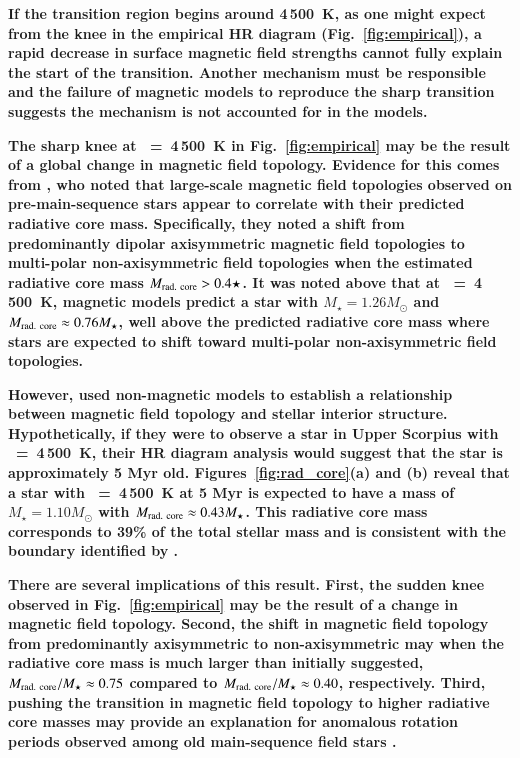 \documentclass{aa}
\begin{document}

{\bf If the transition region begins around 4\,500~K, as one might expect from the knee in the empirical HR diagram (Fig.~\ref{fig:empirical}), a rapid decrease in surface magnetic field strengths cannot fully explain the start of the transition. Another mechanism must be responsible and the failure of magnetic models to reproduce the sharp transition suggests the mechanism is not accounted for in the models.}

{\bf The sharp knee at \teff~=~4\,500~K in Fig.~\ref{fig:empirical} may be the result of a global change in magnetic field topology. Evidence for this comes from \citet{Gregory2012}, who noted that large-scale magnetic field topologies observed on pre-main-sequence stars appear to correlate with their predicted radiative core mass. Specifically, they noted a shift from predominantly dipolar axisymmetric magnetic field topologies to multi-polar non-axisymmetric field topologies when the estimated radiative core mass $M_{\rm rad.\ core} > 0.4 \star$. It was noted above that at \teff~=~4\,500~K, magnetic models predict a star with $M_{\star} = 1.26 M_{\odot}$ and $M_{\rm rad.\ core} \approx 0.76 M_{\star}$, well above the predicted radiative core mass where stars are expected to shift toward multi-polar non-axisymmetric field topologies.}

{\bf However, \citet{Gregory2012} used non-magnetic models \citep{Siess2000} to establish a relationship between magnetic field topology and stellar interior structure. Hypothetically, if they were to observe a star in Upper Scorpius with \teff~=~4\,500~K, their HR diagram analysis would suggest that the star is approximately 5 Myr old. Figures~\ref{fig:rad_core}(a) and (b) reveal that a star with \teff~=~4\,500~K at 5 Myr is expected to have a mass of $M_{\star} = 1.10 M_{\odot}$ with $M_{\rm rad.\ core} \approx 0.43 M_{\star}$. This radiative core mass corresponds to 39\% of the total stellar mass and is consistent with the boundary identified by \citet{Gregory2012}.} 

{\bf There are several implications of this result. First, the sudden knee observed in Fig.~\ref{fig:empirical} may be the result of a change in magnetic field topology. Second, the shift in magnetic field topology from predominantly axisymmetric to non-axisymmetric may when the radiative core mass is much larger than initially suggested, $M_{\rm rad.\ core} / M_{\star} \approx 0.75$ compared to $M_{\rm rad.\ core} / M_{\star} \approx 0.40$, respectively. Third, pushing the transition in magnetic field topology to higher radiative core masses may provide an explanation for anomalous rotation periods observed among old main-sequence field stars \citep{vanSaders2016}.}
\end{document}
